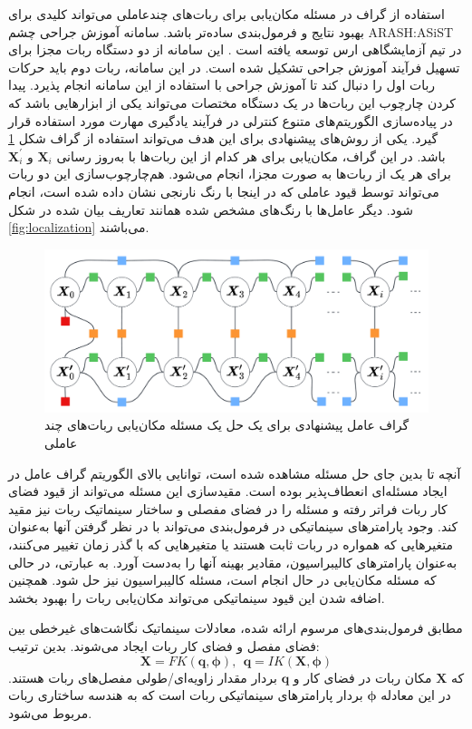 استفاده از گراف در مسئله مکان‌یابی برای ربات‌های چندعاملی می‌تواند کلیدی برای بهبود نتایج و فرمول‌بندی ساده‌تر باشد. سامانه آموزش جراحی چشم 
ARASH:ASiST 
در تیم آزمایشگاهی ارس توسعه یافته است
\cite{hassani2021kinematic}. این سامانه از دو دستگاه ربات مجزا برای تسهیل فرآیند آموزش جراحی تشکیل شده است. در این سامانه، ربات دوم باید حرکات ربات اول را دنبال کند تا آموزش جراحی با استفاده از این سامانه انجام پذیرد. پیدا کردن چارچوب این ربات‌ها در یک دستگاه مختصات می‌تواند یکی از ابزارهایی باشد که در پیاده‌سازی الگوریتم‌های متنوع کنترلی در فرآیند یادگیری مهارت مورد استفاده قرار گیرد. یکی از روش‌های پیشنهادی برای این هدف می‌تواند استفاده از گراف شکل 
\ref{fig:arashasistlocalization}
باشد. در این گراف، مکان‌یابی برای هر کدام از این ربات‌ها با به‌روز رسانی
$\boldsymbol{X}_{i}$
و
$\boldsymbol{X}_{i}^{'}$
برای هر یک از ربات‌ها به صورت مجزا، انجام می‌شود. هم‌چارچوب‌سازی این دو ربات می‌تواند توسط قیود عاملی که در اینجا با رنگ نارنجی نشان داده شده است، انجام شود. دیگر عامل‌ها با رنگ‌های مشخص شده همانند تعاریف بیان شده در شکل 
\ref{fig:localization}
می‌باشند. 

\begin{figure}
	\centering
	\includegraphics[width=0.7\linewidth]{img/Arash_Asist_localization}
	\caption{گراف عامل پیشنهادی برای یک حل یک مسئله مکان‌یابی ربات‌های چند عاملی}
	\label{fig:arashasistlocalization}
\end{figure}


آنچه تا بدین جای حل مسئله مشاهده شده است، توانایی بالای الگوریتم گراف عامل در ایجاد مسئله‌ای انعطاف‌پذیر بوده است. مقیدسازی این مسئله می‌تواند از قیود فضای کار ربات فراتر رفته و مسئله را در فضای مفصلی و ساختار سینماتیک ربات نیز مقید کند. وجود پارامترهای سینماتیکی در فرمول‌بندی می‌تواند با در نظر گرفتن آنها به‌عنوان متغیرهایی که همواره در ربات ثابت هستند یا متغیرهایی که با گذر زمان تغییر می‌کنند، به‌عنوان پارامترهای کالیبراسیون، مقادیر بهینه آنها را به‌دست آورد. به عبارتی، در حالی که مسئله مکان‌یابی در حال انجام است، مسئله کالیبراسیون نیز حل شود. همچنین اضافه شدن این قیود سینماتیکی می‌تواند مکان‌یابی ربات را بهبود بخشد.

مطابق فرمول‌بندی‌های مرسوم ارائه شده، معادلات سینماتیک نگاشت‌های غیرخطی بین فضای مفصل و فضای کار ربات ایجاد می‌شوند. بدین ترتیب:
\begin{equation} \label{eq:IK_FK_genral_equations}
	\boldsymbol{X} = FK(\boldsymbol{q}, \boldsymbol{\phi}), ~~ \boldsymbol{q} = IK(\boldsymbol{X}, \boldsymbol{\phi})
\end{equation}
که
$\boldsymbol{X}$
مکان ربات در فضای کار و
$\boldsymbol{q}$
بردار مقدار زاویه‌ای/طولی مفصل‌های ربات هستند. در این معادله
$\boldsymbol{\phi}$
بردار پارامترهای سینماتیکی ربات است که به هندسه ساختاری ربات مربوط می‌شود.


